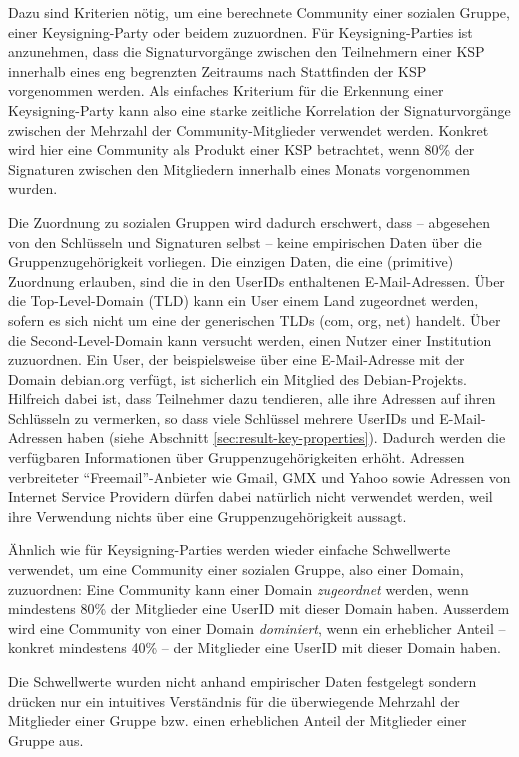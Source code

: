 Dazu sind Kriterien n\"otig, um eine berechnete Community einer
sozialen Gruppe, einer Keysigning-Party oder beidem zuzuordnen. F\"ur
Keysigning-Parties ist anzunehmen, dass die Signaturvorg\"ange
zwischen den Teilnehmern einer KSP innerhalb eines eng begrenzten
Zeitraums nach Stattfinden der KSP vorgenommen werden. Als einfaches
Kriterium f\"ur die Erkennung einer Keysigning-Party kann also eine
starke zeitliche Korrelation der Signaturvorg\"ange zwischen der
Mehrzahl der Community-Mitglieder verwendet werden. Konkret wird hier
eine Community als Produkt einer KSP betrachtet, wenn 80\% der
Signaturen zwischen den Mitgliedern innerhalb eines Monats vorgenommen
wurden.

Die Zuordnung zu sozialen Gruppen wird dadurch erschwert, dass --
abgesehen von den Schl\"usseln und Signaturen selbst -- keine
empirischen Daten \"uber die Gruppenzugeh\"origkeit vorliegen. Die
einzigen Daten, die eine (primitive) Zuordnung erlauben, sind die in
den UserIDs enthaltenen E-Mail-Adressen. \"Uber die Top-Level-Domain
(TLD) kann ein User einem Land zugeordnet werden, sofern es sich nicht
um eine der generischen TLDs (com, org, net) handelt. \"Uber die
Second-Level-Domain kann versucht werden, einen Nutzer einer
Institution zuzuordnen. Ein User, der beispielsweise \"uber eine
E-Mail-Adresse mit der Domain debian.org verf\"ugt, ist sicherlich ein
Mitglied des Debian-Projekts. Hilfreich dabei ist, dass Teilnehmer
dazu tendieren, alle ihre Adressen auf ihren Schl\"usseln zu
vermerken, so dass viele Schl\"ussel mehrere UserIDs und
E-Mail-Adressen haben (siehe Abschnitt
\ref{sec:result-key-properties}). Dadurch werden die verf\"ugbaren
Informationen \"uber Gruppenzugeh\"origkeiten erh\"oht. Adressen
verbreiteter ``Freemail''-Anbieter wie Gmail, GMX und Yahoo sowie
Adressen von Internet Service Providern d\"urfen dabei nat\"urlich
nicht verwendet werden, weil ihre Verwendung nichts \"uber eine
Gruppenzugeh\"origkeit aussagt.

\"Ahnlich wie f\"ur Keysigning-Parties werden wieder einfache
Schwellwerte verwendet, um eine Community einer sozialen Gruppe, also
einer Domain, zuzuordnen: Eine Community kann einer Domain
\emph{zugeordnet} werden, wenn mindestens 80\% der Mitglieder
eine UserID mit dieser Domain haben. Ausserdem wird eine Community von
einer Domain \emph{dominiert}, wenn ein erheblicher Anteil -- konkret
mindestens 40\% -- der Mitglieder eine UserID mit dieser Domain haben.

Die Schwellwerte wurden nicht anhand empirischer Daten festgelegt
sondern dr\"ucken nur ein intuitives Verst\"andnis f\"ur die
\"uberwiegende Mehrzahl der Mitglieder einer Gruppe bzw. einen
erheblichen Anteil der Mitglieder einer Gruppe aus.


